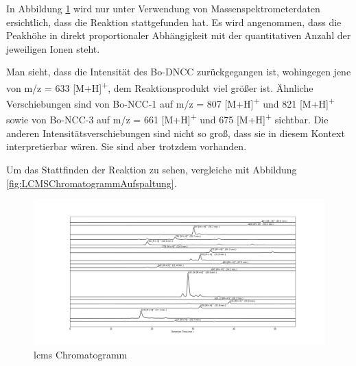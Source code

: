 In Abbildung \ref{fig:LCMSChromatogrammRPAufspaltung} wird nur unter Verwendung von Massenspektrometerdaten ersichtlich, dass die Reaktion stattgefunden hat. Es wird angenommen, dass die Peakhöhe in direkt proportionaler Abhängigkeit mit der quantitativen Anzahl der jeweiligen Ionen steht.

Man sieht, dass die Intensität des Bo-DNCC zurückgegangen ist, wohingegen jene von m/z = 633 [M+H]\textsuperscript{+}, dem Reaktionsprodukt viel größer ist. Ähnliche Verschiebungen sind von Bo-NCC-1 auf m/z = 807 [M+H]\textsuperscript{+} und 821 [M+H]\textsuperscript{+} sowie von Bo-NCC-3 auf m/z = 661 [M+H]\textsuperscript{+} und 675 [M+H]\textsuperscript{+} sichtbar. Die anderen Intensitätsverschiebungen sind nicht so groß, dass sie in diesem Kontext interpretierbar wären. Sie sind aber trotzdem vorhanden.

Um das Stattfinden der Reaktion zu sehen, vergleiche mit Abbildung \ref{fig:LCMSChromatogrammAufspaltung}.

\begin{figure}[!htbp]
  \centering
  \includegraphics[width=1\textwidth]{figures/Kapitel6/Reaktion3h/Kuerbis_Analyse_Reaktion3h_LC-ESI-MS.png}
  \caption[LC-MS Chromatogramm nach 3h Reaktionsdauer - Aufspaltung, Quelle: Autor]{\gls{lcms} Chromatogramm}
  \label{fig:LCMSChromatogrammRPAufspaltung}
\end{figure}

